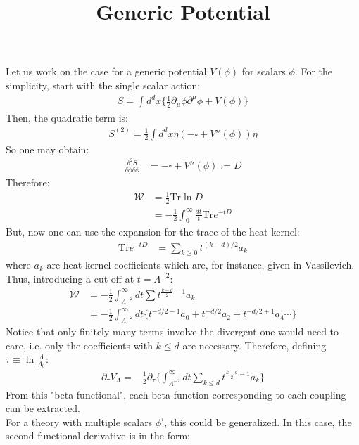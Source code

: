 \documentclass[fleqn]{article}
\title{Generic Potential}
\begin{document}
\maketitle
Let us work on the case for a generic potential $V(\phi)$ for scalars $\phi$. For the simplicity, start with the single scalar action:
\begin{align}
S = \int d^{d}x \lbrace \frac{1}{2}\partial _{\mu} \phi \partial ^{\mu} \phi + V(\phi) \rbrace
\end{align}
Then, the quadratic term is:
\begin{align}
S^{(2)} = \frac{1}{2}  \int d^{d} x \eta(-\square + V''(\phi)) \eta
\end{align}
So one may obtain:
\begin{align}
\frac{\delta ^{2} S}{\delta \phi \delta \phi} &= -\square + V''(\phi)  := D
\end{align}
Therefore:
\begin{align}
\mathcal{W} &= \frac{1}{2} \text{Tr} \ln D \nonumber \\
& = -\frac{1}{2} \int _{0}^{\infty} \frac{dt}{t} \text{Tr} e^{-tD} 
\end{align}
But, now one can use the expansion for the trace of the heat kernel:
\begin{align}
\text{Tr} e^{-tD} &=  \sum_{k \ge 0}t^{(k-d)/2} a_{k}
\end{align}
where $a_{k}$ are heat kernel coefficients which are, for instance, given in Vassilevich. \\
Thus, introducing a cut-off at $ t = \Lambda^{-2}$:
\begin{align}
\mathcal{W} & = -\frac{1}{2}\int _{\Lambda^{-2}}^{\infty} dt \sum t^{\frac{k-d}{2} -1} a_{k}  \nonumber \\
&=-\frac{1}{2} \int_{\Lambda ^{-2}}^{\infty} dt \lbrace t^{-d/2-1} a_{0} + t^{-d/2} a_{2} + t^{-d/2 + 1} a_{4}  \cdots \rbrace
\end{align}
Notice that only finitely many terms involve the divergent one would need to care, i.e. only the coefficients with $k \leq d$ are necessary. Therefore, defining $\tau \equiv \ln \frac{\Lambda}{\Lambda_{0}}$:
\begin{align}
\partial _{\tau} V_{\Lambda} = -\frac{1}{2} \partial _{\tau} \lbrace \int _{\Lambda ^{-2}}^{\infty} dt \sum_{k \leq d} t^{\frac{k-d}{2} -1} a_{k} \rbrace
\end{align}
From this "beta functional", each beta-function corresponding to each coupling can be extracted. \\
For a theory with multiple scalars $\phi ^{i}$, this could be generalized. In this case, the second functional derivative is in the form:
\end{document}
